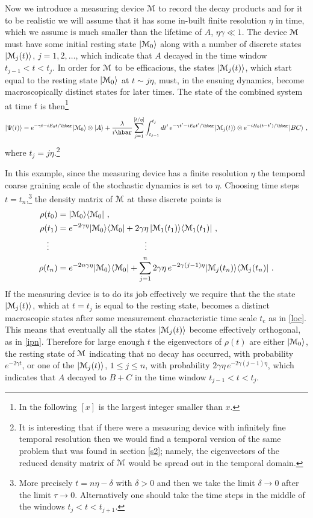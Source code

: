 \documentclass[12pt]{article}
\def\BM{{\EuScript M}}
\def\bra#1{\langle #1|}
\def\ket#1{| #1\rangle}
\newcommand{\EQ}[1]{\begin{equation}\begin{split} #1
\end{split}\end{equation}}
\begin{document}
Now we introduce a measuring device $\BM$ to record the decay products and for it to be realistic we will assume that it has some in-built finite resolution $\eta$ in time, which we assume is much smaller than the lifetime of $A$, $\eta\gamma\ll 1$. The device $\BM$ must have some initial resting state $\ket{\BM_0}$ along with a number of discrete states $\ket{\BM_j(t)}$, $j=1,2,\ldots$, which indicate that $A$ decayed in the time window $t_{j-1}<t<t_j$. In order for $\BM$ to be efficacious, the states $\ket{\BM_j(t)}$, which start equal to the resting state $\ket{\BM_0}$ at $t\sim j\eta$, must, in the ensuing dynamics, become macroscopically distinct states for later times.
The state of the combined system at time $t$ is then\footnote{In the following $[x]$ is the largest integer smaller than $x$.}
\EQ{
\ket{\Psi(t)}=e^{-\gamma t-iE_0t/\hbar}\ket{\BM_0}\otimes\ket{A}+\frac{\lambda}{i\hbar}\sum_{j=1}^{[t/\eta]}\int_{t_{j-1}}^{t_j}dt'\,e^{-\gamma t'-iE_0t'/\hbar}\ket{\BM_j(t)}\otimes e^{-iH_0(t-t')/\hbar}\ket{BC}\ ,
\label{shd}
}
where $t_j=j\eta$.\footnote{It is interesting that if there were a measuring device with infinitely fine temporal resolution then we would find a temporal version of the same problem that was found in section \ref{s2}; namely, the eigenvectors of the reduced density matrix of $\BM$ would be spread out in the temporal domain.} 

In this example, since the measuring device has a finite resolution $\eta$ the temporal coarse graining scale of the stochastic dynamics is set to $\eta$. Choosing time steps $t=t_n$,\footnote{More precisely $t=n\eta-\delta$ with $\delta>0$ and then we take the limit $\delta\to0$ after the limit $\tau\to0$. Alternatively one should take the time steps in the middle of the windows $t_j<t<t_{j+1}$.}
the density matrix of $\BM$ at these discrete points is
\EQ{
\rho(t_0)&=\ket{\BM_0}\bra{\BM_0}\ ,\\
\rho(t_1)&=e^{-2\gamma\eta}\ket{\BM_0}\bra{\BM_0}
+2\gamma\eta\,\ket{\BM_1(t_1)}\bra{\BM_1(t_1)}\ ,\\
\vdots~~~&~~~~~~~~~~~~~~~~~~~~~~~~~~~~~~~\vdots\\
\rho(t_n)&=e^{-2n\gamma\eta}\ket{\BM_0}\bra{\BM_0}+\sum_{j=1}^n 2\gamma\eta\,e^{-2\gamma (j-1)\eta}\ket{\BM_j(t_n)}\bra{\BM_j(t_n)}\ .
}
If the measuring device is to do its job
effectively we require that the 
the state $\ket{\BM_j(t)}$, which at $t=t_j$ is equal to the resting state, becomes a 
distinct macroscopic states after some measurement characteristic time scale $t_\text{c}$ as in \eqref{loc}.
This means that eventually all the states $\ket{\BM_j(t)}$ become
 effectively orthogonal, as in \eqref{ipn}. Therefore for large enough $t$ the eigenvectors of $\rho(t)$ are either $\ket{\BM_0}$, the resting state of $\BM$ indicating that no decay has occurred, with probability $e^{-2\gamma t}$, or one of the $\ket{\BM_j(t)}$, $1\leq j\leq n$, with probability $2\gamma\eta\,e^{-2\gamma (j-1)\eta}$, which indicates that $A$ decayed to $B+C$ in the time window $t_{j-1}<t<t_j$. 
\end{document}
